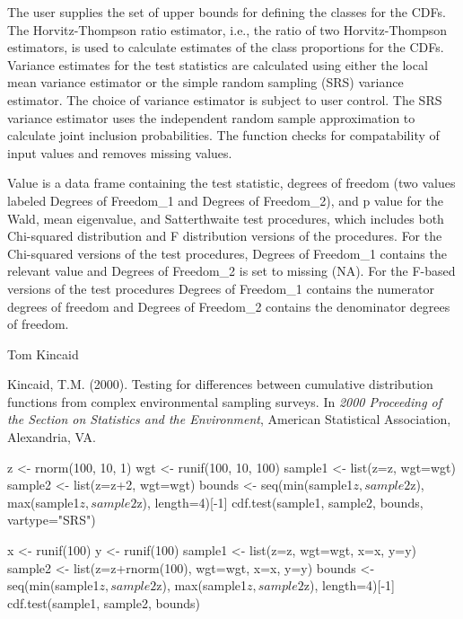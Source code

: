 \begin{Details}\relax
The user supplies the set of upper bounds for defining the classes for the
CDFs.  The Horvitz-Thompson ratio estimator, i.e., the ratio of two
Horvitz-Thompson estimators, is used to calculate estimates of the class
proportions for the CDFs.  Variance estimates for the test statistics are
calculated using either the local mean variance estimator or the simple random
sampling (SRS) variance estimator.  The choice of variance estimator is
subject to user control.  The SRS variance estimator uses the
independent random sample approximation to calculate joint inclusion
probabilities.  The function checks for compatability of input values and
removes missing values.
\end{Details}
\begin{Value}
Value is a data frame containing the test statistic, degrees of 
freedom (two values labeled Degrees of Freedom\_1 and Degrees of  Freedom\_2),
and p value for the Wald, mean eigenvalue, and Satterthwaite test procedures,
which includes both Chi-squared distribution and F  distribution versions of 
the procedures.  For the Chi-squared versions of  the test procedures, Degrees
of Freedom\_1 contains the relevant value  and Degrees of Freedom\_2 is set to 
missing (NA).  For the F-based  versions of the test procedures Degrees of 
Freedom\_1 contains the  numerator degrees of freedom and Degrees of 
Freedom\_2 contains the  denominator degrees of freedom.
\end{Value}
\begin{Author}\relax
Tom Kincaid 
\end{Author}
\begin{References}\relax
Kincaid, T.M. (2000). Testing for differences between cumulative distribution
functions from complex environmental sampling surveys.  In \emph{2000
Proceeding of the Section on Statistics and the Environment}, American
Statistical Association, Alexandria, VA.
\end{References}
\begin{Examples}
\begin{ExampleCode}
z <- rnorm(100, 10, 1)
wgt <- runif(100, 10, 100)
sample1 <- list(z=z, wgt=wgt)
sample2 <- list(z=z+2, wgt=wgt)
bounds <- seq(min(sample1$z, sample2$z), max(sample1$z,
   sample2$z), length=4)[-1]
cdf.test(sample1, sample2, bounds, vartype="SRS")

x <- runif(100)
y <- runif(100)
sample1 <- list(z=z, wgt=wgt, x=x, y=y)
sample2 <- list(z=z+rnorm(100), wgt=wgt, x=x, y=y)
bounds <- seq(min(sample1$z, sample2$z), max(sample1$z,
   sample2$z), length=4)[-1]
cdf.test(sample1, sample2, bounds)
\end{ExampleCode}
\end{Examples}

